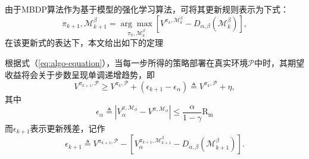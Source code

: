 由于MBDP算法作为基于模型的强化学习算法，可将其更新规则表示为下式：
\begin{equation}
    \pi_{k+1}, \mathcal{M}^\beta_{k+1}=\underset{\pi_k, \mathcal{M}_k^\beta}{\arg\max}\left[{V}^{\pi_k, \mathcal{M}_k^\beta}-D_{\alpha,\beta}(\mathcal{M}^\beta_k)\right],
\label{eq:algo-equation}
\end{equation}
在该更新式的表达下，本文给出如下的定理
\begin{theorem}
根据式（\ref{eq:algo-equation}），当每一步所得的策略部署在真实环境$\mathcal{P}$中时，其期望收益将会关于步数呈现单调递增趋势，即
\begin{equation}
    {V}^{\pi_{k+1}, \mathcal{P}}\geq {V}^{\pi_{k}, \mathcal{P}} + (\epsilon_{k+1} - \epsilon_\alpha) \triangleq {V}^{\pi_{k}, \mathcal{P}} + \eta,
\end{equation}
其中
\begin{equation}
    \epsilon_\alpha \triangleq |{V}_\alpha^{\pi, \mathcal{M}_{\phi}} - {V}^{\pi,\mathcal{M}_{\phi}}|   \leq \frac{\alpha}{1-\gamma}\mathrm{R_{m}}
\end{equation}
而$\epsilon_{k+1}$表示更新残差，记作
\begin{equation}
    \epsilon_{k+1} \triangleq {V}^{\pi_{k+1}, \mathcal{P}} - \left[{V}_{\alpha}^{\pi_{k+1}, \mathcal{M}_{k+1}^\beta} - D_{\alpha,\beta}(\mathcal{M}_{k+1}^\beta)\right].
\end{equation}
\label{prop:performance}
\end{theorem}

